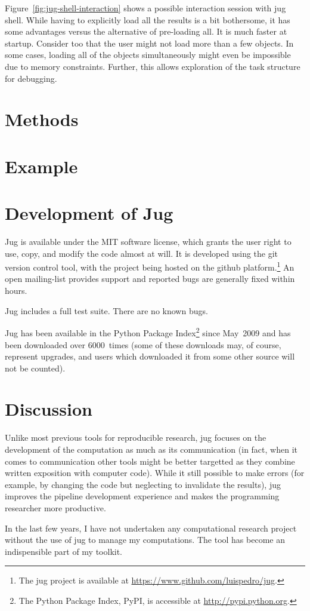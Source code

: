\documentclass{article}
\begin{document}
Figure~\ref{fig:jug-shell-interaction} shows a possible interaction session
with jug shell. While having to explicitly load all the results is a bit
bothersome, it has some advantages versus the alternative of pre-loading all.
It is much faster at startup. Consider too that the user might not load more
than a few objects. In some cases, loading all of the objects simultaneously
might even be impossible due to memory constraints. Further, this allows
exploration of the task structure for debugging.

\section{Methods}
\section{Example}
\section{Development of Jug}
Jug is available under the MIT software license, which grants the user right to
use, copy, and modify the code almost at will. It is developed using the git
version control tool, with the project being hosted on the github
platform.\footnote{The jug project is available at
\url{https://www.github.com/luispedro/jug}.} An open mailing-list provides
support and reported bugs are generally fixed within hours.

Jug includes a full test suite. There are no known bugs.

Jug has been available in the Python Package Index\footnote{The Python Package
Index, PyPI, is accessible at \url{http://pypi.python.org}.} since May~2009
and has been downloaded over 6000~times (some of these downloads may, of
course, represent upgrades, and users which downloaded it from some other
source will not be counted).%

\section{Discussion}
Unlike most previous tools for reproducible research, jug focuses on the
development of the computation as much as its communication (in fact, when it
comes to communication other tools might be better targetted as they combine
written exposition with computer code). While it still possible to make errors
(for example, by changing the code but neglecting to invalidate the results),
jug improves the pipeline development experience and makes the programming
researcher more productive.

In the last few years, I have not undertaken any computational research project
without the use of jug to manage my computations. The tool has become an
indispensible part of my toolkit.
\end{document}
